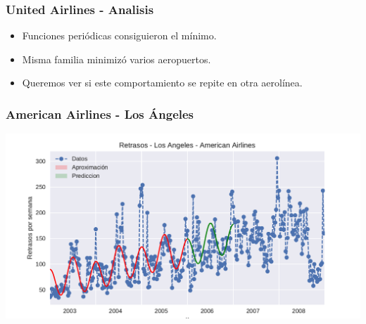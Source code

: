 \documentclass{beamer}
\begin{document}
\begin{frame}


\frametitle{United Airlines - Analisis}

\begin{itemize}

\item{Funciones periódicas consiguieron el mínimo.}
\item{Misma familia minimizó varios aeropuertos.}
\item{Queremos ver si este comportamiento se repite en otra aerolínea.}

\end{itemize}

\end{frame}


\begin{frame}


\frametitle{American Airlines - Los Ángeles}

{\centering
  \includegraphics[width=1.0\linewidth]{diapos/imagenes/retrasosAmericanAirlinesLAvol3.pdf}
}

\end{frame}

\end{document}
